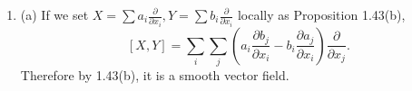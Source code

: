 \begin{enumerate}
(b) By following the argument, we need only to show that $d \psi_{I}$ is surjective. 
Since $\psi(A)=\big(\sum_{k} a_{ik} a_{jk}\big)_{ij}$, $d \psi_{A}=\big(\sum_{k}(a_{jk} d a_{ik}+a_{ik} d a_{jk})\big)_{ij}$. $\therefore d \psi_{I}=\left(d a_{i j}+d a_{j i}\right)_{i j}$. But, since $G l(n, \mathbb{R})_{I} \cong M_{n \times n}(\mathbb{R})$, it is surjective onto $\operatorname{Sym}_{n}(\mathbb{R})_{I} \cong \operatorname{Sym}_{n}(\mathbb{R})$.
\item (a) If we set $X=\sum a_{i} \frac{\partial}{\partial x_{i}}, Y=\sum b_{i} \frac{\partial}{\partial x_{i}}$ locally as Proposition 1.43(b),
\[[X, Y]=\sum_{i} \sum_{j}\left(a_{i} \frac{\partial b_{j}}{\partial x_{i}}-b_{i} \frac{\partial a_{j}}{\partial x_{i}}\right) \frac{\partial}{\partial x_{j}}.\]
Therefore by 1.43(b), it is a smooth vector field.


\end{enumerate}
